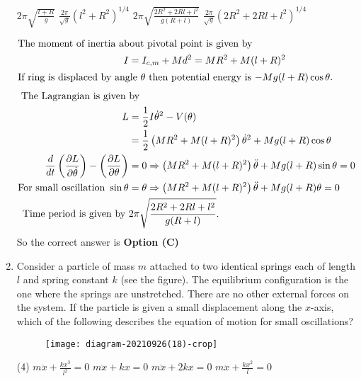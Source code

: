 \begin{enumerate}
\begin{tasks}
		\task[\textbf{A.}] $2 \pi \sqrt{\frac{l+R}{g}}$
		\task[\textbf{B.}] $\frac{2 \pi}{\sqrt{g}}\left(l^{2}+R^{2}\right)^{1 / 4}$
		\task[\textbf{C.}] $2 \pi \sqrt{\frac{2 R^{2}+2 R l+l^{2}}{g(R+l)}}$
		\task[\textbf{D.}] $\frac{2 \pi}{\sqrt{g}}\left(2 R^{2}+2 R l+l^{2}\right)^{1 / 4}$
	\end{tasks}	
\begin{answer}
	\begin{align*}
	\intertext{The moment of inertia about pivotal point is given by}
	I&=I_{c, m}+M d^{2}=M R^{2}+M(l+R)^{2}\\
	\intertext{If ring is displaced by angle $\theta$ then potential energy is $-M g(l+R) \cos \theta$.}
	\intertext{ The Lagrangian is given by}
	L&=\frac{1}{2} I \dot{\theta}^{2}-V(\theta)\\&=\frac{1}{2}\left(M R^{2}+M(l+R)^{2}\right) \dot{\theta}^{2}+M g(l+R) \cos \theta\\
	\frac{d}{d t}\left(\frac{\partial L}{\partial \dot{\theta}}\right)-\left(\frac{\partial L}{\partial \theta}\right)&=0 \Rightarrow\left(M R^{2}+M(l+R)^{2}\right) \ddot{\theta}+M g(l+R) \sin \theta=0\\
	\text{For small oscillation }\sin \theta&=\theta \Rightarrow\left(M R^{2}+M(l+R)^{2}\right) \ddot{\theta}+M g(l+R) \theta=0\\
	\text{Time period is given by }&2 \pi \sqrt{\frac{2 R^{2}+2 R l+l^{2}}{g(R+l)}}.
	\end{align*}
	So the correct answer is \textbf{Option (C)}
\end{answer}
	\item Consider a particle of mass $m$ attached to two identical springs each of length $l$ and spring constant $k$ (see the figure). The equilibrium configuration is the one where the springs are unstretched. There are no other external forces on the system. If the particle is given a small displacement along the $x$-axis, which of the following describes the equation of motion for small oscillations?
	{}
	\begin{figure}[H]
		\centering
		\texttt{[image: diagram-20210926(18)-crop]}
	\end{figure}
	\begin{tasks}(4)
		\task[\textbf{A.}] $m \ddot{x}+\frac{k x^{3}}{l^{2}}=0$
		\task[\textbf{B.}]  $m \ddot{x}+k x=0$
		\task[\textbf{C.}] $m \ddot{x}+2 k x=0$
		\task[\textbf{D.}] $m \ddot{x}+\frac{k x^{2}}{l}=0$
	\end{tasks}	
\begin{answer}$\left. \right. $

\end{answer}
\end{enumerate}
